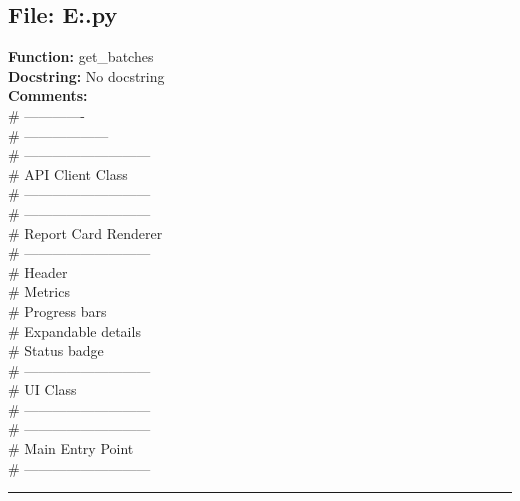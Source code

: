{\subsection*{File: E:\project\capstone\frontend\view.py}
\textbf{Function:} get_batches\\
\textbf{Docstring:} No docstring\\
\textbf{Comments:}\\
# -------------\\
# ------------------\\
# ---------------------------\\
# API Client Class\\
# ---------------------------\\
# ---------------------------\\
# Report Card Renderer\\
# ---------------------------\\
# Header\\
# Metrics\\
# Progress bars\\
# Expandable details\\
# Status badge\\
# ---------------------------\\
# UI Class\\
# ---------------------------\\
# ---------------------------\\
# Main Entry Point\\
# ---------------------------\\

\hrule

}
